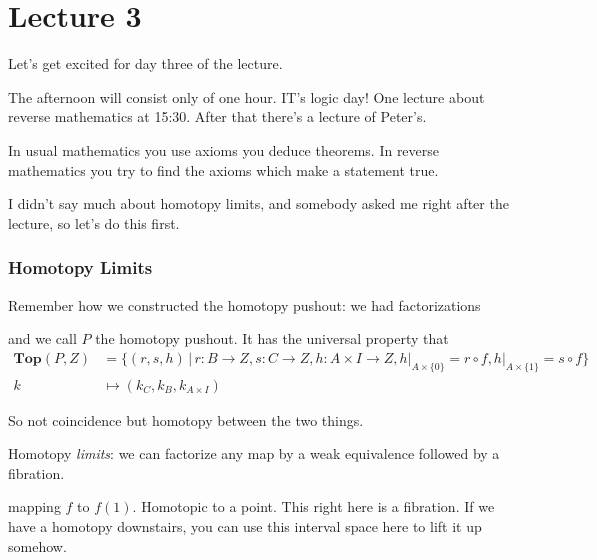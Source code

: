 \documentclass[class=report, crop=false,a4paper,twoside]{standalone}
\begin{document}
\chapter{Lecture 3}
Let's get excited for day three of the lecture.

The afternoon will consist only of one hour. IT's logic day! One lecture about reverse mathematics at 15:30. After that there's a lecture of Peter's. 

In usual mathematics you use axioms you deduce theorems. In reverse mathematics you try to find the axioms which make a statement true.

I didn't say much about homotopy limits, and somebody asked me right after the lecture, so let's do this first.

\subsection{Homotopy Limits}
Remember how we constructed the homotopy pushout: we had factorizations
\begin{center}
\end{center}
and we call $P$ the homotopy pushout. It has the universal property that
\begin{align*}
\mathbf{Top}(P,Z) &= \{(r,s,h) \,|\, r: B \to Z, s: C \to Z, h: A \times I \to Z, h|_{A \times \{0\}} = r \circ f, h|_{A \times \{1\}} = s \circ f\}\\
	k &\mapsto (k_C,k_B,k_{A \times I})
\end{align*}

So not coincidence but homotopy between the two things. 

Homotopy \emph{limits}: we can factorize any map by a weak equivalence followed by a fibration. 

\begin{center}
\end{center}
mapping $f$ to $f(1)$. Homotopic to a point. This right here is a fibration. If we have a homotopy downstairs, you can use this interval space here to lift it up somehow.
\end{document}
